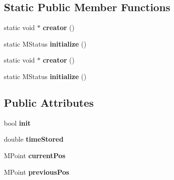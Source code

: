 \subsection*{Static Public Member Functions}
\begin{DoxyCompactItemize}
\item 
\hypertarget{class_m_g__jiggle_vector_a0121ffd8ea61b3fa769adae6d3ec46d5}{static void $\ast$ {\bfseries creator} ()}\label{class_m_g__jiggle_vector_a0121ffd8ea61b3fa769adae6d3ec46d5}

\item 
\hypertarget{class_m_g__jiggle_vector_afb29784790d236396b200b53e35623ba}{static M\-Status {\bfseries initialize} ()}\label{class_m_g__jiggle_vector_afb29784790d236396b200b53e35623ba}

\item 
\hypertarget{class_m_g__jiggle_vector_a0121ffd8ea61b3fa769adae6d3ec46d5}{static void $\ast$ {\bfseries creator} ()}\label{class_m_g__jiggle_vector_a0121ffd8ea61b3fa769adae6d3ec46d5}

\item 
\hypertarget{class_m_g__jiggle_vector_afb29784790d236396b200b53e35623ba}{static M\-Status {\bfseries initialize} ()}\label{class_m_g__jiggle_vector_afb29784790d236396b200b53e35623ba}

\end{DoxyCompactItemize}
\subsection*{Public Attributes}
\begin{DoxyCompactItemize}
\item 
\hypertarget{class_m_g__jiggle_vector_aa9f53afa76e98b44e7534522587acebd}{bool {\bfseries init}}\label{class_m_g__jiggle_vector_aa9f53afa76e98b44e7534522587acebd}

\item 
\hypertarget{class_m_g__jiggle_vector_aa7a47471e04d1f948fc3d70440284ac6}{double {\bfseries time\-Stored}}\label{class_m_g__jiggle_vector_aa7a47471e04d1f948fc3d70440284ac6}

\item 
\hypertarget{class_m_g__jiggle_vector_aef136bbc2480201c94748a9d5ebbf983}{M\-Point {\bfseries current\-Pos}}\label{class_m_g__jiggle_vector_aef136bbc2480201c94748a9d5ebbf983}

\item 
\hypertarget{class_m_g__jiggle_vector_a3192c684150e8801e1bde1fc36683244}{M\-Point {\bfseries previous\-Pos}}\label{class_m_g__jiggle_vector_a3192c684150e8801e1bde1fc36683244}

\end{DoxyCompactItemize}
